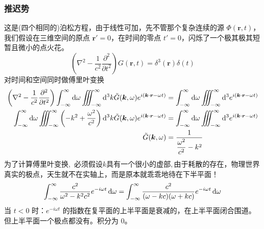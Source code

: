 \subsubsection{推迟势}
这是(四个相同的)泊松方程，由于线性可加，先不管那个复杂连续的源 $\Phi(\boldsymbol{r}, t)$，我们假设在三维空间的原点 $\boldsymbol{r}' = 0$，在时间的零点 $t' = 0$，闪烁了一个极其极其短暂且微小的点火花。
$$\left(\nabla^2 - \frac{1}{c^2}\frac{\partial^2}{\partial t^2}\right) G(\boldsymbol{r}, t) = \delta^3(\boldsymbol{r})\delta(t)$$
对时间和空间同时做傅里叶变换
\begin{align}
    \left(\nabla^2 - \frac{1}{c^2}\frac{\partial^2}{\partial t^2}\right)  \int_{-\infty}^{\infty} \dif \omega \iiint_{-\infty}^{\infty} \dif^3k  \tilde{G}(\boldsymbol{k}, \omega) e^{i(\boldsymbol{k} \cdot \boldsymbol{r} - \omega t)} &=\int_{-\infty}^{\infty} \dif\omega \iiint_{-\infty}^{\infty} \dif^3 e^{i(\boldsymbol{k} \cdot \boldsymbol{r} - \omega t)}\nonumber\\
      \int_{-\infty}^{\infty} \dif\omega \iiint_{-\infty}^{\infty} \left(-k^2+\frac{\omega^2}{c^2}\right)\dif^3k  \tilde{G}(\boldsymbol{k}, \omega) e^{i(\boldsymbol{k} \cdot \boldsymbol{r} - \omega t)} &=\int_{-\infty}^{\infty} \dif\omega \iiint_{-\infty}^{\infty} \dif^3 e^{i(\boldsymbol{k} \cdot \boldsymbol{r} - \omega t)}\nonumber\\
      \tilde{G}(\boldsymbol{k}, \omega) &= \frac{1}{\dfrac{\omega^2}{c^2} - k^2}
      \end{align}
      为了计算傅里叶变换,\, 必须假设$k$具有一个很小的虚部,\,由于耗散的存在，物理世界真实的极点，天生就不在实轴上，而是原本就乖乖地待在下半平面！
      $$
      \int_{-\infty}^{\infty}  \frac{c^2}{\omega^2 - k^2c^2} e^{-i\omega t}\dif\omega=\int_{-\infty}^{\infty}  \frac{c^2}{(\omega- kc)(\omega + kc)} e^{-i\omega t}\dif\omega
$$
当 $t < 0$ 时：$e^{-i\omega t}$ 的指数在复平面的上半平面是衰减的，在上半平面闭合围道。但上半平面一个极点都没有。积分为 0。

